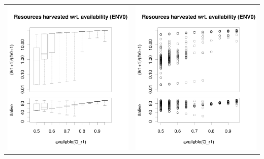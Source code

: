 \documentclass[a4paper,10pt]{article}
\begin{document}
\begin{table}[H]
\begin{tabular}{cc}
\newline
\includegraphics[width=\imgSize]{../images/5StaticEnv/ratioAndRep_staticEnv0LogY}& \includegraphics[width=\imgSize]{../images/5StaticEnv/ratioAndRep_staticEnvPlot0LogY}\\
\end{tabular}
\end{table}
\end{document}
